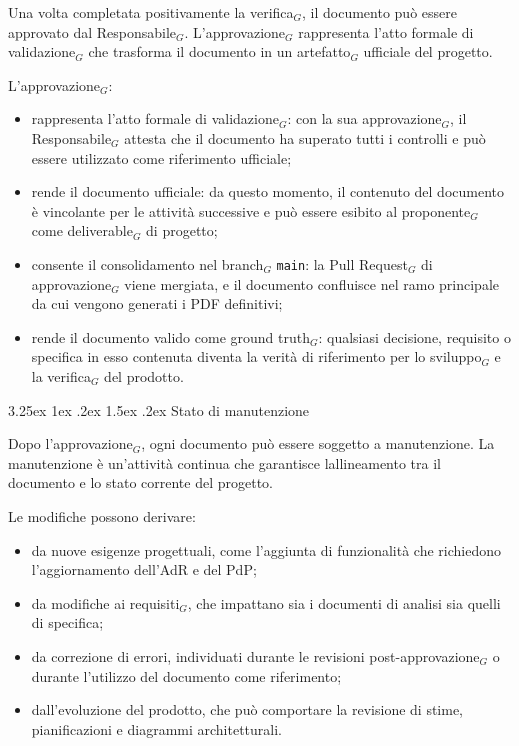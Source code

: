 \documentclass[a4paper, 10pt]{article}
\makeatletter
\renewcommand\paragraph{\@startsection{paragraph}{4}{\z@}%
  {3.25ex \@plus1ex \@minus .2ex}%
  {1.5ex \@plus .2ex}%
  {\normalfont\normalsize\bfseries}}
\makeatother
\begin{document}
Una volta completata positivamente la verifica$_G$, il documento può essere approvato dal Responsabile$_G$. L'approvazione$_G$ rappresenta l'atto formale di validazione$_G$ che trasforma il documento in un artefatto$_G$ ufficiale del progetto.

L'approvazione$_G$:
\begin{itemize}
    \item rappresenta l'atto formale di validazione$_G$: con la sua approvazione$_G$, il Responsabile$_G$ attesta che il documento ha superato tutti i controlli e può essere utilizzato come riferimento ufficiale;
    \item rende il documento ufficiale: da questo momento, il contenuto del documento è vincolante per le attività successive e può essere esibito al proponente$_G$ come deliverable$_G$ di progetto;
    \item consente il consolidamento nel branch$_G$ \texttt{main}: la Pull Request$_G$ di approvazione$_G$ viene mergiata, e il documento confluisce nel ramo principale da cui vengono generati i PDF definitivi;
    \item rende il documento valido come ground truth$_G$: qualsiasi decisione, requisito o specifica in esso contenuta diventa la verità di riferimento per lo sviluppo$_G$ e la verifica$_G$ del prodotto.
\end{itemize}

\paragraph{Stato di manutenzione}

Dopo l'approvazione$_G$, ogni documento può essere soggetto a manutenzione. La manutenzione è un'attività continua che garantisce lallineamento tra il documento e lo stato corrente del progetto.

Le modifiche possono derivare:
\begin{itemize}
    \item da nuove esigenze progettuali, come l'aggiunta di funzionalità che richiedono l'aggiornamento dell'AdR e del PdP;
    \item da modifiche ai requisiti$_G$, che impattano sia i documenti di analisi sia quelli di specifica;
    \item da correzione di errori, individuati durante le revisioni post-approvazione$_G$ o durante l'utilizzo del documento come riferimento;
    \item dall'evoluzione del prodotto, che può comportare la revisione di stime, pianificazioni e diagrammi architetturali.
\end{itemize}
\end{document}
